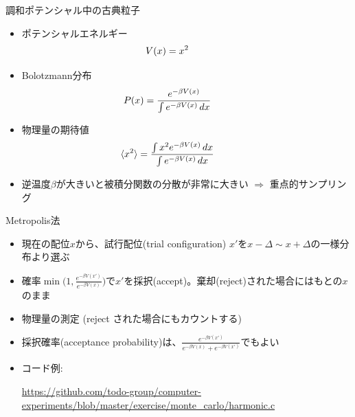 \documentclass[dvipdfmx]{beamer}
\begin{document}
\begin{frame}[t,fragile]{調和ポテンシャル中の古典粒子}
  \begin{itemize}
    \setlength{\itemsep}{1em}
  \item ポテンシャルエネルギー
    \[ \hspace*{-4em} V(x) = x^2 \]
  \item Bolotzmann分布
    \[ \hspace*{-4em} P(x) = \frac{e^{-\beta V(x)}}{\int e^{-\beta V(x)} \, dx} \]
  \item 物理量の期待値
    \[ \hspace*{-4em} \langle x^2 \rangle = \frac{\int x^2 e^{-\beta V(x)} \, dx}{\int e^{-\beta V(x)} \, dx} \]
  \item 逆温度$\beta$が大きいと被積分関数の分散が非常に大きい $\Rightarrow$ 重点的サンプリング
  \end{itemize}
  \vspace*{-16em} \hfill
\end{frame}

\begin{frame}[t,fragile]{Metropolis法}
  \begin{itemize}
    \setlength{\itemsep}{1em}
  \item 現在の配位$x$から、試行配位(trial configuration) $x'$を$x - \Delta \sim x + \Delta$の一様分布より選ぶ
  \item 確率$\min \Big( 1, \frac{e^{-\beta V(x')}}{e^{-\beta V(x)}} \Big)$で$x'$を採択(accept)。棄却(reject)された場合にはもとの$x$のまま
  \item 物理量の測定 (reject された場合にもカウントする)
  \item 採択確率(acceptance probability)は、$\frac{e^{-\beta V(x')}}{e^{-\beta V(x)}+e^{-\beta V(x')}}$でもよい
  \item コード例:

    {\tiny \url{https://github.com/todo-group/computer-experiments/blob/master/exercise/monte_carlo/harmonic.c}}
  \end{itemize}
\end{frame}
\end{document}
